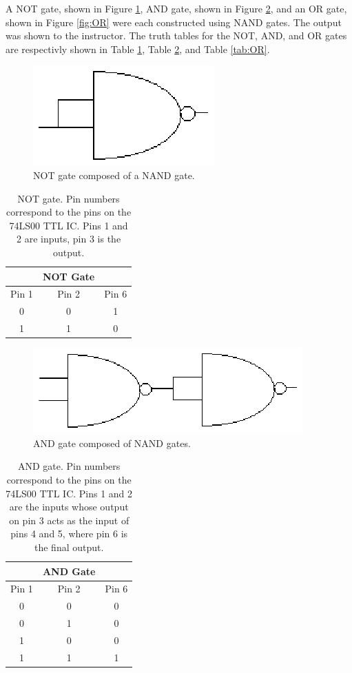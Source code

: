 \documentclass[11pt,onecolumn,letter]{article}
\begin{document}
A NOT gate, shown in Figure \ref{fig:NOT}, AND gate, shown in Figure \ref{fig:AND}, and an OR gate, shown in Figure \ref{fig:OR} were each constructed using NAND gates. The output was shown to the instructor. The truth tables for the NOT, AND, and OR gates are respectivly shown in Table \ref{tab:NOT}, Table \ref{tab:AND}, and Table \ref{tab:OR}.
%
%
\begin{figure}
\center
\includegraphics{NOT.eps}
\caption{NOT gate composed of a NAND gate.}\label{fig:NOT}
\end{figure}
%
%
\begin{table}
\center
\begin{tabular}{ccc}
	& NOT Gate	& \\
\hline
Pin 1	& Pin 2	& Pin 6 \\
\hline
0	& 0	& 1 \\
1	& 1	& 0 \\
\end{tabular}
\caption{NOT gate. Pin numbers correspond to the pins on the 74LS00 TTL IC. Pins 1 and 2 are inputs, pin 3 is the output.}\label{tab:NOT}
\end{table}
%
%
\begin{figure}
\center
\includegraphics{AND.eps}
\caption{AND gate composed of NAND gates.}\label{fig:AND}
\end{figure}
%
%
\begin{table}
\center
\begin{tabular}{ccc}
	& AND Gate	& \\
\hline
Pin 1	& Pin 2	& Pin 6 \\
\hline
0	& 0	& 0 \\
0	& 1	& 0 \\
1	& 0	& 0 \\
1	& 1	& 1 \\
\end{tabular}
\caption{AND gate. Pin numbers correspond to the pins on the 74LS00 TTL IC. Pins 1 and 2 are the inputs whose output on pin 3 acts as the input of pins 4 and 5, where pin 6 is the final output.}\label{tab:AND}
\end{table}
\end{document}
